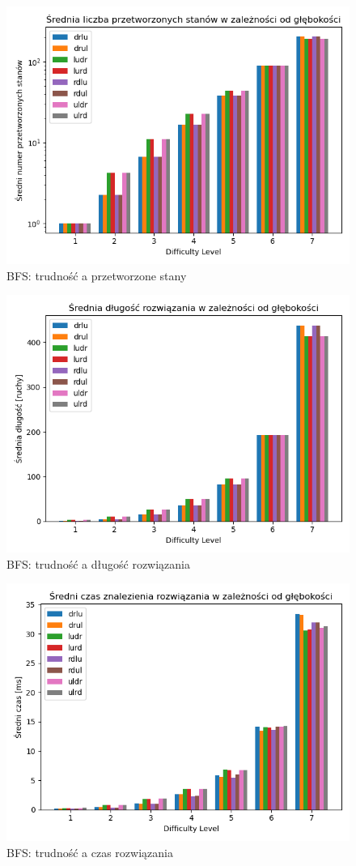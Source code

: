 \documentclass{classrep}
\begin{document}
\begin{figure}[p] \centering
 \includegraphics[width=0.9\linewidth]{./pic/bfs_proc_c_vs_diff.png}
 \caption{BFS: trudność a przetworzone stany}
\end{figure}
\begin{figure}[p] \centering
 \includegraphics[width=0.9\linewidth]{./pic/bfs_sol_len_vs_diff.png}
 \caption{BFS: trudność a długość rozwiązania}
\end{figure}
\begin{figure}[p] \centering
 \includegraphics[width=0.9\linewidth]{./pic/bfs_time_vs_diff.png}
 \caption{BFS: trudność a czas rozwiązania}
\end{figure}
\end{document}
